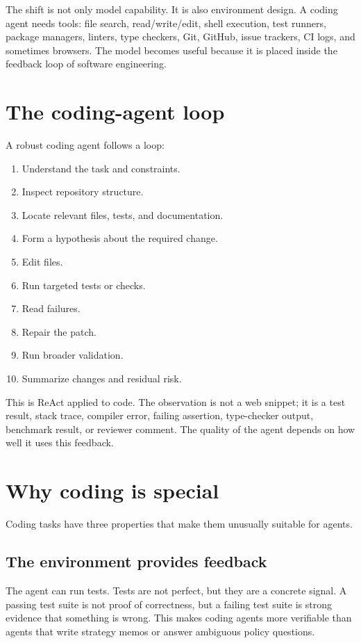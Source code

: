 The shift is not only model capability. It is also environment design. A coding agent needs tools: file search, read/write/edit, shell execution, test runners, package managers, linters, type checkers, Git, GitHub, issue trackers, CI logs, and sometimes browsers. The model becomes useful because it is placed inside the feedback loop of software engineering.

\section{The coding-agent loop}

A robust coding agent follows a loop:

\begin{enumerate}[leftmargin=*]
  \item Understand the task and constraints.
  \item Inspect repository structure.
  \item Locate relevant files, tests, and documentation.
  \item Form a hypothesis about the required change.
  \item Edit files.
  \item Run targeted tests or checks.
  \item Read failures.
  \item Repair the patch.
  \item Run broader validation.
  \item Summarize changes and residual risk.
\end{enumerate}

This is ReAct applied to code. The observation is not a web snippet; it is a test result, stack trace, compiler error, failing assertion, type-checker output, benchmark result, or reviewer comment. The quality of the agent depends on how well it uses this feedback.

\section{Why coding is special}

Coding tasks have three properties that make them unusually suitable for agents.

\subsection{The environment provides feedback}

The agent can run tests. Tests are not perfect, but they are a concrete signal. A passing test suite is not proof of correctness, but a failing test suite is strong evidence that something is wrong. This makes coding agents more verifiable than agents that write strategy memos or answer ambiguous policy questions.

